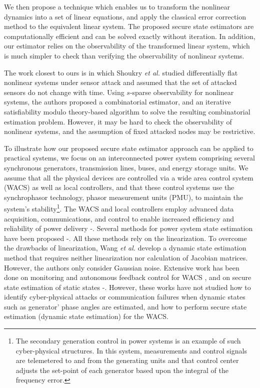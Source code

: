We then propose a technique which enables us to transform the nonlinear dynamics into a set of linear equations, and apply the classical error correction method to the equivalent linear system. The proposed secure state estimators are computationally efficient and can be solved exactly without iteration. In addition, our estimator relies on the observability of the transformed linear system, which is much simpler to check than verifying the observability of nonlinear systems.


The work closest to ours is \cite{shoukry} in which Shoukry \textit{et al.} studied differentially flat nonlinear systems under sensor attack and assumed that the set of attacked sensors do not change with time. Using $s$-sparse observability for nonlinear systems, the authors proposed a combinatorial estimator, and an iterative satisfiability modulo theory-based algorithm to solve the resulting combinatorial estimation problem. However, it may be hard to check the observability of nonlinear systems, and the assumption of fixed attacked nodes may be restrictive.


To illustrate how our proposed secure state estimator approach can be applied to practical systems, we focus on an interconnected power system comprising several synchronous generators, transmission lines, buses, and energy storage units. We assume that all the physical devices are controlled via a wide area control system (WACS) as well as local controllers, and that these control systems use the synchrophasor technology, phasor measurement units (PMU), to maintain the system's stability\footnote{The secondary generation control in power systems is an example of such cyber-physical structures. In this system, measurements and control signals are telemetered to and from the generating units and that control center adjusts the set-point of each generator based upon the integral of the frequency error.}. The WACS and local controllers employ advanced data acquisition, communications, and control to enable increased efficiency and reliability of power delivery \cite{pmu_w_0}-\!\!\cite{wacs_ref8}. Several methods for power system state estimation have been proposed \cite{ref_v11}-\!\!\cite{ref_v16}. %
All these methods rely on the linearization. To overcome the drawbacks of linearization, Wang \textit{et al.} \cite{nonlin_est} develop a dynamic state estimation method that requires neither linearization nor calculation of Jacobian matrices. However, the authors only consider Gaussian noise. Extensive work has been done on monitoring and autonomous feedback control for WACS \cite{wacs_ref8}, and on secure state estimation of static states \cite{ref_v1}-\!\!\cite{Tong}. However, these works have not studied how to identify cyber-physical attacks or communication failures when dynamic states such as generator' phase angles are estimated, and how to perform secure state estimation (dynamic state estimation) for the WACS.

